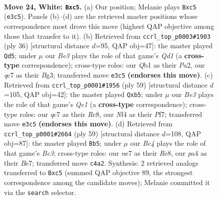\documentclass[11pt]{article}
\begin{document}
\clearpage

\begin{figure}[p]\centering
\begin{subfigure}{0.46\textwidth}\centering
\resizebox{\linewidth}{!}{%
\newchessgame
\chessboard[
  setfen={1nb2kr1/2q1n3/4p3/2r1Pp2/p1B2N2/P3B3/2P2KPp/RQ5R w - - 0 24},
  showmover=false,
  pgfstyle=straightmove, color=movearrow, markmove={e3-c5}
]}
\caption{}
\end{subfigure}\hfill
\begin{subfigure}{0.46\textwidth}\centering
\resizebox{\linewidth}{!}{%
\newchessgame
\chessboard[
  setfen={2rqkb2/p2n1p2/b2P3r/4p2B/Npp4R/6B1/PP3PP1/R2QK3 w Q - 1 19},
  showmover=false,
  pgfstyle=straightmove, color=movearrow, markmove={d1-d5}
]}
\caption{}
\end{subfigure}
\\[4pt]
\begin{subfigure}{0.46\textwidth}\centering
\resizebox{\linewidth}{!}{%
\newchessgame
\chessboard[
  setfen={1rr1q1k1/5p2/1R4pb/1Q1pP3/p2P2b1/5NP1/NP2BP2/4R1K1 b - - 0 30},
  showmover=false,
  pgfstyle=straightmove, color=movearrow, markmove={e8-b5}
]}
\caption{}
\end{subfigure}\hfill
\begin{subfigure}{0.46\textwidth}\centering
\resizebox{\linewidth}{!}{%
\newchessgame
\chessboard[
  setfen={1q2r1k1/3nbpp1/R1b4p/4pP2/2N1P2P/1r4PK/1B4B1/2RQ4 b - - 3 30},
  showmover=false,
  pgfstyle=straightmove, color=movearrow, markmove={c6-b5}
]}
\caption{}
\end{subfigure}
\caption{\textbf{Move 24, White: \texttt{Bxc5}.} (a) Our position; Melanie plays \texttt{Bxc5} (\texttt{e3c5}). Panels (b)--(d) are the retrieved master positions whose correspondence most drove this move (highest QAP objective among those that transfer to it). (b) Retrieved from \texttt{ccrl\_top\_p0003\#1903} (ply 36) [structural distance $d$=95, QAP obj=47]: the master played \texttt{Qd5}; under $\mu$ our \emph{Be3} plays the role of that game's \emph{Qd1} (a \textbf{cross-type} correspondence); cross-type roles: our \emph{Q}b1 as their \emph{P}a2, our \emph{q}c7 as their \emph{B}g3; transferred move \texttt{e3c5} \textbf{(endorses this move)}. (c) Retrieved from \texttt{ccrl\_top\_p0001\#1956} (ply 59) [structural distance $d$=105, QAP obj=42]: the master played \texttt{Qxb5}; under $\mu$ our \emph{Be3} plays the role of that game's \emph{Qe1} (a \textbf{cross-type} correspondence); cross-type roles: our \emph{q}c7 as their \emph{R}c8, our \emph{N}f4 as their \emph{P}f7; transferred move \texttt{e3c5} \textbf{(endorses this move)}. (d) Retrieved from \texttt{ccrl\_top\_p0001\#2664} (ply 59) [structural distance $d$=108, QAP obj=87]: the master played \texttt{Bb5}; under $\mu$ our \emph{Bc4} plays the role of that game's \emph{Bc3}; cross-type roles: our \emph{n}e7 as their \emph{R}e8, our \emph{p}a4 as their \emph{B}e7; transferred move \texttt{c4a2}. Synthesis: 2 retrieved analogs transferred to \texttt{Bxc5} (summed QAP objective 89, the strongest correspondence among the candidate moves); Melanie committed it via the \texttt{search} selector.}
\label{fig:thought-m46}
\end{figure}
\end{document}
